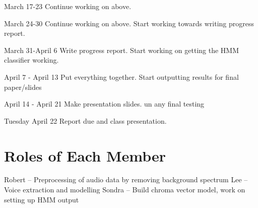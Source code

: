 \documentclass{article}
\begin{document}
March 17-23\newline
Continue working on above.\newline
\newline

March 24-30\newline 
Continue working on above. Start working towards writing progress report.\newline
\newline

March 31-April 6\newline
Write progress report. Start working on getting the HMM classifier working.\newline
\newline

April 7 - April 13\newline
Put everything together. Start outputting results for final paper/slides\newline
\newline

April 14 - April 21\newline
Make presentation slides. un any final testing\newline
\newline

Tuesday April 22\newline
Report due and class presentation.\newline
\newline

\section{Roles of Each Member}

Robert -- Preprocessing of audio data by removing background spectrum \newline
Lee -- Voice extraction and modelling\newline
Sondra -- Build chroma vector model, work on setting up HMM output\newline
\end{document}
